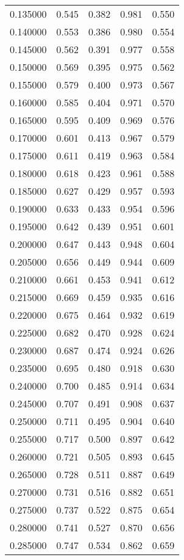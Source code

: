 \begin{table}[htbp]
\begin{tabular}{lllll}
0.135000 & 0.545 & 0.382 & 0.981 & 0.550 \\
0.140000 & 0.553 & 0.386 & 0.980 & 0.554 \\
0.145000 & 0.562 & 0.391 & 0.977 & 0.558 \\
0.150000 & 0.569 & 0.395 & 0.975 & 0.562 \\
0.155000 & 0.579 & 0.400 & 0.973 & 0.567 \\
0.160000 & 0.585 & 0.404 & 0.971 & 0.570 \\
0.165000 & 0.595 & 0.409 & 0.969 & 0.576 \\
0.170000 & 0.601 & 0.413 & 0.967 & 0.579 \\
0.175000 & 0.611 & 0.419 & 0.963 & 0.584 \\
0.180000 & 0.618 & 0.423 & 0.961 & 0.588 \\
0.185000 & 0.627 & 0.429 & 0.957 & 0.593 \\
0.190000 & 0.633 & 0.433 & 0.954 & 0.596 \\
0.195000 & 0.642 & 0.439 & 0.951 & 0.601 \\
0.200000 & 0.647 & 0.443 & 0.948 & 0.604 \\
0.205000 & 0.656 & 0.449 & 0.944 & 0.609 \\
0.210000 & 0.661 & 0.453 & 0.941 & 0.612 \\
0.215000 & 0.669 & 0.459 & 0.935 & 0.616 \\
0.220000 & 0.675 & 0.464 & 0.932 & 0.619 \\
0.225000 & 0.682 & 0.470 & 0.928 & 0.624 \\
0.230000 & 0.687 & 0.474 & 0.924 & 0.626 \\
0.235000 & 0.695 & 0.480 & 0.918 & 0.630 \\
0.240000 & 0.700 & 0.485 & 0.914 & 0.634 \\
0.245000 & 0.707 & 0.491 & 0.908 & 0.637 \\
0.250000 & 0.711 & 0.495 & 0.904 & 0.640 \\
0.255000 & 0.717 & 0.500 & 0.897 & 0.642 \\
0.260000 & 0.721 & 0.505 & 0.893 & 0.645 \\
0.265000 & 0.728 & 0.511 & 0.887 & 0.649 \\
0.270000 & 0.731 & 0.516 & 0.882 & 0.651 \\
0.275000 & 0.737 & 0.522 & 0.875 & 0.654 \\
0.280000 & 0.741 & 0.527 & 0.870 & 0.656 \\
0.285000 & 0.747 & 0.534 & 0.862 & 0.659 \\

\end{tabular}
\end{table}

